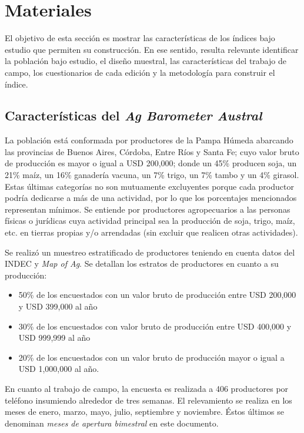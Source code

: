\documentclass[12pt]{article}
\providecommand{\tightlist}{%
  \setlength{\itemsep}{0pt}\setlength{\parskip}{0pt}}\usepackage{longtable,booktabs,array}
\begin{document}
\newpage

\section{Materiales}\label{materiales}

El objetivo de esta sección es mostrar las características de los
índices bajo estudio que permiten su construcción. En ese sentido,
resulta relevante identificar la población bajo estudio, el diseño
muestral, las características del trabajo de campo, los cuestionarios de
cada edición y la metodología para construir el índice.

\subsection{\texorpdfstring{Características del \emph{Ag Barometer
Austral}}{Características del Ag Barometer Austral}}\label{sec-materiales_arg}

La población está conformada por productores de la Pampa Húmeda
abarcando las provincias de Buenos Aires, Córdoba, Entre Ríos y Santa
Fe; cuyo valor bruto de producción es mayor o igual a USD 200,000; donde
un 45\% producen soja, un 21\% maíz, un 16\% ganadería vacuna, un 7\%
trigo, un 7\% tambo y un 4\% girasol. Estas últimas categorías no son
mutuamente excluyentes porque cada productor podría dedicarse a más de
una actividad, por lo que los porcentajes mencionados representan
mínimos. Se entiende por productores agropecuarios a las personas
físicas o jurídicas cuya actividad principal sea la producción de soja,
trigo, maíz, etc. en tierras propias y/o arrendadas (sin excluir que
realicen otras actividades).

Se realizó un muestreo estratificado de productores teniendo en cuenta
datos del INDEC y \emph{Map of Ag}. Se detallan los estratos de
productores en cuanto a su producción:

\begin{itemize}
\tightlist
\item
  50\% de los encuestados con un valor bruto de producción entre USD
  200,000 y USD 399,000 al año
\item
  30\% de los encuestados con valor bruto de producción entre USD
  400,000 y USD 999,999 al año
\item
  20\% de los encuestados con un valor bruto de producción mayor o igual
  a USD 1,000,000 al año.
\end{itemize}

En cuanto al trabajo de campo, la encuesta es realizada a 406
productores por teléfono insumiendo alrededor de tres semanas. El
relevamiento se realiza en los meses de enero, marzo, mayo, julio,
septiembre y noviembre. Éstos últimos se denominan \emph{meses de
apertura bimestral} en este documento.
\end{document}
